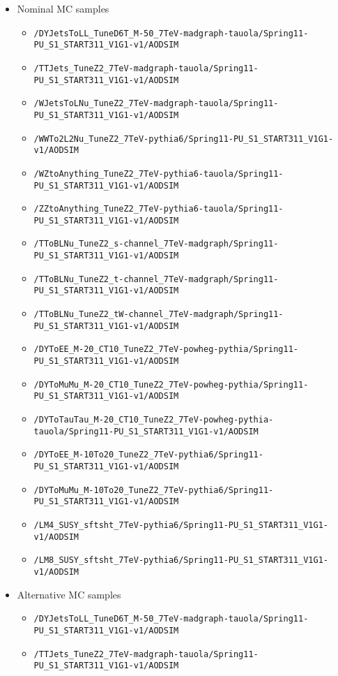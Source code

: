 {\begin{itemize}
\item Nominal MC samples
  \begin{itemize} 
  \item \verb=/DYJetsToLL_TuneD6T_M-50_7TeV-madgraph-tauola/Spring11-PU_S1_START311_V1G1-v1/AODSIM=
  \item \verb=/TTJets_TuneZ2_7TeV-madgraph-tauola/Spring11-PU_S1_START311_V1G1-v1/AODSIM=
  \item \verb=/WJetsToLNu_TuneZ2_7TeV-madgraph-tauola/Spring11-PU_S1_START311_V1G1-v1/AODSIM=
  \item \verb=/WWTo2L2Nu_TuneZ2_7TeV-pythia6/Spring11-PU_S1_START311_V1G1-v1/AODSIM=
  \item \verb=/WZtoAnything_TuneZ2_7TeV-pythia6-tauola/Spring11-PU_S1_START311_V1G1-v1/AODSIM=
  \item \verb=/ZZtoAnything_TuneZ2_7TeV-pythia6-tauola/Spring11-PU_S1_START311_V1G1-v1/AODSIM=
  \item \verb=/TToBLNu_TuneZ2_s-channel_7TeV-madgraph/Spring11-PU_S1_START311_V1G1-v1/AODSIM=
  \item \verb=/TToBLNu_TuneZ2_t-channel_7TeV-madgraph/Spring11-PU_S1_START311_V1G1-v1/AODSIM=
  \item \verb=/TToBLNu_TuneZ2_tW-channel_7TeV-madgraph/Spring11-PU_S1_START311_V1G1-v1/AODSIM=
  \item \verb=/DYToEE_M-20_CT10_TuneZ2_7TeV-powheg-pythia/Spring11-PU_S1_START311_V1G1-v1/AODSIM=
  \item \verb=/DYToMuMu_M-20_CT10_TuneZ2_7TeV-powheg-pythia/Spring11-PU_S1_START311_V1G1-v1/AODSIM=
  \item \verb=/DYToTauTau_M-20_CT10_TuneZ2_7TeV-powheg-pythia-tauola/Spring11-PU_S1_START311_V1G1-v1/AODSIM=
  \item \verb=/DYToEE_M-10To20_TuneZ2_7TeV-pythia6/Spring11-PU_S1_START311_V1G1-v1/AODSIM=
  \item \verb=/DYToMuMu_M-10To20_TuneZ2_7TeV-pythia6/Spring11-PU_S1_START311_V1G1-v1/AODSIM=
  \item \verb=/LM4_SUSY_sftsht_7TeV-pythia6/Spring11-PU_S1_START311_V1G1-v1/AODSIM=
  \item \verb=/LM8_SUSY_sftsht_7TeV-pythia6/Spring11-PU_S1_START311_V1G1-v1/AODSIM=
  \end{itemize}

\item Alternative MC samples
  \begin{itemize} 
  \item \verb=/DYJetsToLL_TuneD6T_M-50_7TeV-madgraph-tauola/Spring11-PU_S1_START311_V1G1-v1/AODSIM=
  \item \verb=/TTJets_TuneZ2_7TeV-madgraph-tauola/Spring11-PU_S1_START311_V1G1-v1/AODSIM=
  \end{itemize}
\end{itemize}
}
